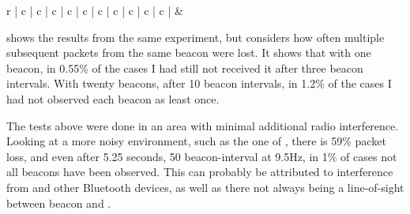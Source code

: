\begin{table}
    \begin{tabular}{r | c | c | c | c | c | c | c | c | c | c |}
        &  \\
    \end{tabular}
    \caption{Measured chance that not all beacons have been observed at different listening intervals.}
    \label{tbl:rss-packet-loss-empirical}
\end{table}

 shows the results from the same experiment, but considers how often multiple subsequent packets from the same beacon were lost.
It shows that with one beacon, in 0.55\% of the cases I had still not received it after three beacon intervals.
With twenty beacons, after 10 beacon intervals, in 1.2\% of the cases I had not observed each beacon as least once.

The tests above were done in an area with minimal additional radio interference.
Looking at a more noisy environment, such as the one of , there is 59\% packet loss, and even after 5.25 seconds, 50 beacon-interval at 9.5Hz, in 1\% of cases not all beacons have been observed.
This can probably be attributed to interference from \wifi and other Bluetooth devices, as well as there not always being a line-of-sight between beacon and \device.
